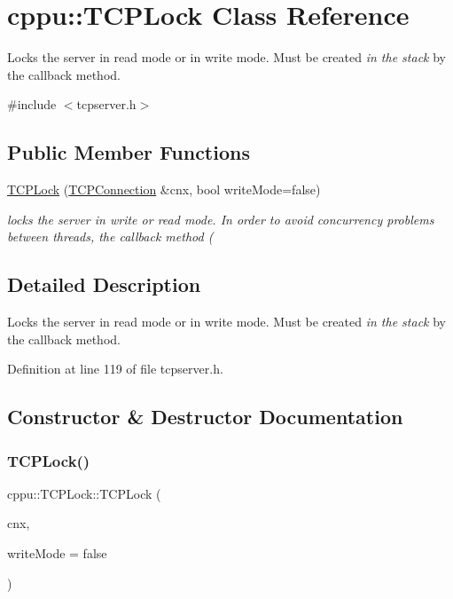 \hypertarget{classcppu_1_1_t_c_p_lock}{}\section{cppu\+:\+:T\+C\+P\+Lock Class Reference}
\label{classcppu_1_1_t_c_p_lock}


Locks the server in read mode or in write mode. Must be created {\itshape in the stack} by the callback method.  




{\ttfamily \#include $<$tcpserver.\+h$>$}

\subsection*{Public Member Functions}
\begin{DoxyCompactItemize}
\item 
\mbox{\hyperlink{classcppu_1_1_t_c_p_lock_ad9ff8205f334918a69746ef90f731877}{T\+C\+P\+Lock}} (\mbox{\hyperlink{classcppu_1_1_t_c_p_connection}{T\+C\+P\+Connection}} \&cnx, bool write\+Mode=false)
\begin{DoxyCompactList}\small\item\em locks the server in {\itshape write} or {\itshape read} mode. In order to avoid concurrency problems between threads, the callback method ( \end{DoxyCompactList}\end{DoxyCompactItemize}


\subsection{Detailed Description}
Locks the server in read mode or in write mode. Must be created {\itshape in the stack} by the callback method. 

Definition at line 119 of file tcpserver.\+h.



\subsection{Constructor \& Destructor Documentation}
\mbox{\label{classcppu_1_1_t_c_p_lock_ad9ff8205f334918a69746ef90f731877}} 
\subsubsection{\texorpdfstring{TCPLock()}{TCPLock()}}
{\footnotesize\ttfamily cppu\+::\+T\+C\+P\+Lock\+::\+T\+C\+P\+Lock (\begin{DoxyParamCaption}\item[{\mbox{\hyperlink{classcppu_1_1_t_c_p_connection}{T\+C\+P\+Connection}} \&}]{cnx,  }\item[{bool}]{write\+Mode = {\ttfamily false} }\end{DoxyParamCaption})}



